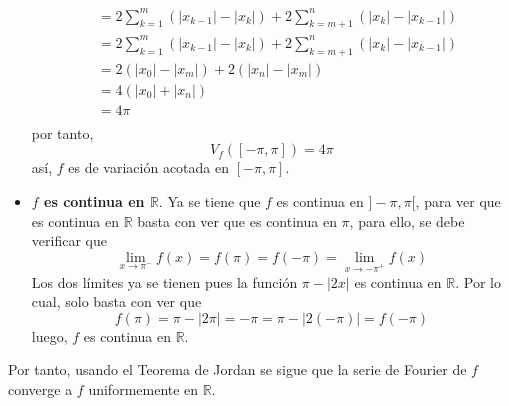 \documentclass[12pt]{report}
\theoremstyle{largebreak}
\newcommand\abs[1]{\ensuremath{\left|#1\right|}}
\begin{document}
\begin{sol}
\begin{itemize}
\begin{equation*}
\begin{split}
                    &=2\sum_{ k=1}^m(\abs{x_{k-1}}-\abs{x_k})+2\sum_{ k=m+1}^n(\abs{x_k}-\abs{x_{ k-1}})\\
                    &=2\sum_{ k=1}^m(\abs{x_{k-1}}-\abs{x_k})+2\sum_{ k=m+1}^n(\abs{x_k}-\abs{x_{ k-1}})\\
                    &=2(\abs{x_0}-\abs{x_m})+2(\abs{x_n}-\abs{x_m})\\
                    &=4(\abs{x_0}+\abs{x_n})\\
                    &=4\pi\\
                \end{split}
            \end{equation*}
            por tanto,
            \begin{equation*}
                V_f([-\pi,\pi])=4\pi
            \end{equation*}
            así, $f$ es de variación acotada en $[-\pi,\pi]$.
            \item \textbf{$f$ es continua en $\mathbb{R}$}. Ya se tiene que $f$ es continua en $]-\pi,\pi[$, para ver que es continua en $\mathbb{R}$ basta con ver que es continua en $\pi$, para ello, se debe verificar que
            \begin{equation*}
                \lim_{x\rightarrow \pi^-}f(x)=f(\pi)=f(-\pi)=\lim_{x\rightarrow-\pi^+}f(x)
            \end{equation*}
            Los dos límites ya se tienen pues la función $\pi-\abs{2x}$ es continua en $\mathbb{R}$. Por lo cual, solo basta con ver que
            \begin{equation*}
                f(\pi)=\pi-\abs{2\pi}=-\pi=\pi-\abs{2(-\pi)}=f(-\pi)
            \end{equation*}
            luego, $f$ es continua en $\mathbb{R}$.
        \end{itemize}
        Por tanto, usando el Teorema de Jordan se sigue que la serie de Fourier de $f$ converge a $f$ uniformemente en $\mathbb{R}$.


\end{sol}
\end{document}
